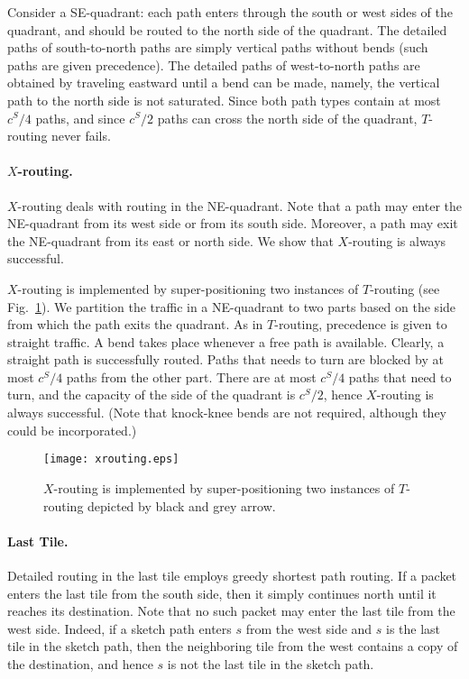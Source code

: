 \documentclass[11pt]{article}
\newenvironment{proof sketch}[1]{\noindent {\emph{Proof sketch of #1:}}}{\hfill \qed}
\begin{document}
Consider a SE-quadrant: each path enters through the south or west sides of the
quadrant, and should be routed to the north side of the quadrant. The detailed paths
of south-to-north paths are simply vertical paths without bends (such paths are given
precedence). The detailed paths of west-to-north paths are obtained by traveling
eastward until a bend can be made, namely, the vertical path to the north side is not
saturated.  Since both path types contain at most $c^S/4$ paths, and since $c^S/2$
paths can cross the north side of the quadrant, $T$-routing never fails.

\paragraph{$X$-routing.}
$X$-routing deals with routing in the NE-quadrant. Note
that a path may enter the  NE-quadrant from its west side
or from its south side. Moreover, a path may exit the
NE-quadrant from its east or north side. We show that
$X$-routing is always successful.

$X$-routing is implemented by super-positioning two
instances of $T$-routing (see Fig.~\ref{fig:X-routing}). We
partition the traffic in a NE-quadrant to two parts based
on the side from which the path exits the quadrant. As in
$T$-routing, precedence is given to straight traffic.  A
bend takes place whenever a free path is available.
Clearly, a straight path is successfully routed. Paths that
needs to turn are blocked by at most $c^S/4$ paths from the
other part. There are at most $c^S/4$ paths that need to
turn, and the capacity of the side of the quadrant is
$c^S/2$, hence $X$-routing is always successful. (Note that
knock-knee bends are not required, although they could be
incorporated.)

    \begin{figure}[h]
      \centering
        \texttt{[image: xrouting.eps]}
      \caption{$X$-routing is implemented by super-positioning two instances of $T$-routing depicted by black and grey arrow.}
      \label{fig:X-routing}
    \end{figure}

\paragraph{Last Tile.}
Detailed routing in the last tile employs greedy shortest path routing.  If a packet
enters the last tile from the south side, then it simply continues north until it
reaches its destination. Note that no such packet may enter the last tile from the
west side. Indeed, if a sketch path enters $s$ from the west side and $s$ is the last
tile in the sketch path, then the neighboring tile from the west contains a copy of the
destination, and hence $s$ is not the last tile in the sketch path.
\end{document}
